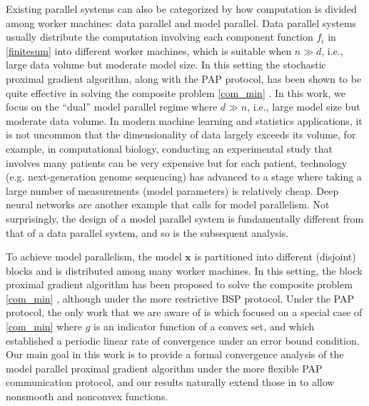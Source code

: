 \documentclass[leqno,onefignum,onetabnum]{siamart0516}
\newcommand{\pap}{PAP\xspace}
\newcommand{\eg}{{e.g.}\xspace}
\newcommand{\ie}{{i.e.}\xspace}
\newcommand{\xb}{\mathbf{x}}
\begin{document}
Existing parallel systems can also be categorized by how computation is divided among worker machines: data parallel and model parallel. Data parallel systems usually distribute the computation involving each component function $f_i$ in \eqref{finitesum} into different worker machines, which is suitable when $n \gg d$, \ie, large data volume but moderate model size. In this setting the stochastic proximal gradient algorithm, along with the \pap protocol, has been shown to be quite effective in solving the composite problem \eqref{com_min} \cite{distrib_delay,delay_pga_linear,ssp_parameter,parameter_server}. In this work, we focus on the ``dual'' model parallel regime where $d \gg n$, \ie, large model size but moderate data volume. 
In modern machine learning and statistics applications, it is not uncommon that the dimensionality of data largely exceeds its volume, for example, in computational biology, conducting an experimental study that involves many patients can be very expensive but for each patient, technology (\eg next-generation genome sequencing) has advanced to a stage where taking a large number of measurements (model parameters) is relatively cheap. Deep neural networks are another example that calls for model parallelism.
Not surprisingly, the design of a model parallel system is fundamentally different from that of a data parallel system, and so is the subsequent analysis. 

To achieve model parallelism, the model $\xb$ is partitioned into different (disjoint) blocks and is distributed among many worker machines. In this setting, 
the block proximal gradient algorithm has been proposed to solve the composite problem \eqref{com_min} \cite{FercoqRichtarik15, LuXiao15, random_block_coord}, although under the more restrictive BSP protocol.
Under the \pap protocol, the only work that we are aware of is \cite{BT_parallel} which focused on a special case of \eqref{com_min} where $g$ is an indicator function of a convex set, and \cite{Tseng_linear_PAA} which established a periodic linear rate of convergence under an error bound condition. 
Our main goal in this work is to provide a formal convergence analysis of the model parallel  proximal gradient algorithm under the more flexible \pap communication protocol, and our results naturally extend those in \cite{BT_parallel,Tseng_linear_PAA} to allow nonsmooth and nonconvex functions.
\end{document}
